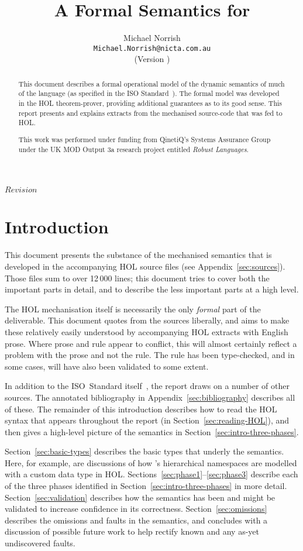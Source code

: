 \documentclass[11pt]{article}
\title{A Formal Semantics for \cpp}
\author{Michael Norrish\\{\small \texttt{Michael.Norrish@nicta.com.au}}\\
{\footnotesize (Version \svnInfoRevision)}}
\date{}
\begin{document}
\svnKeyword $Revision$
\maketitle
\begin{abstract}
  This document describes a formal operational model of the dynamic
  semantics of much of the \cpp{} language (as specified in the ISO
  Standard~\cite{cpp-standard-iso14882}).  The formal model was
  developed in the HOL theorem-prover, providing additional guarantees
  as to its good sense.  This report presents and explains extracts
  from the mechanised source-code that was fed to HOL.

  This work was performed under funding from QinetiQ's Systems
  Assurance Group under the UK MOD Output 3a research project entitled
  \emph{Robust Languages}.
\end{abstract}

\tableofcontents
\listoffigures

\section{Introduction}

This document presents the substance of the mechanised \cpp{}
semantics that is developed in the accompanying HOL source files (see
Appendix~\ref{sec:sources}).  Those files sum to over 12$\,$000 lines;
this document tries to cover both the important parts in detail, and
to describe the less important parts at a high level.

The HOL mechanisation itself is necessarily the only \emph{formal}
part of the deliverable.  This document quotes from the sources
liberally, and aims to make these relatively easily understood by
accompanying HOL extracts with English prose.  Where prose and rule
appear to conflict, this will almost certainly reflect a problem with
the prose and not the rule.  The rule has been type-checked, and in
some cases, will have also been validated to some extent.

In addition to the ISO~Standard itself~\cite{cpp-standard-iso14882},
the report draws on a number of other sources.  The annotated
bibliography in Appendix~\ref{sec:bibliography} describes all of
these.  The remainder of this introduction describes how to read the
HOL syntax that appears throughout the report (in
Section~\ref{sec:reading-HOL}), and then gives a high-level picture of
the \cpp{} semantics in Section~\ref{sec:intro-three-phases}.

Section~\ref{sec:basic-types} describes the basic types that underly
the semantics.  Here, for example, are discussions of how \cpp{}'s
hierarchical namespaces are modelled with a custom data type in
HOL. Sections~\ref{sec:phase1}--\ref{sec:phase3} describe each of the
three phases identified in Section~\ref{sec:intro-three-phases} in
more detail.  Section~\ref{sec:validation} describes how the semantics
has been and might be validated to increase confidence in its
correctness.  Section~\ref{sec:omissions} describes the omissions and
faults in the semantics, and concludes with a discussion of possible
future work to help rectify known and any as-yet undiscovered faults.
\end{document}
